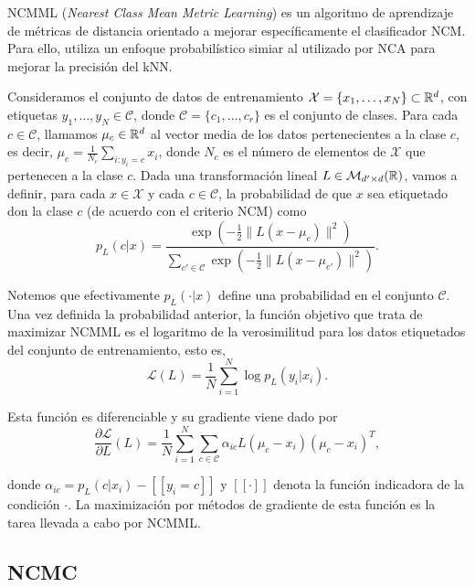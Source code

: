 NCMML (\emph{Nearest Class Mean Metric Learning}) \cite{ncmml} es un algoritmo de aprendizaje de métricas de distancia orientado a mejorar específicamente el clasificador NCM. Para ello, utiliza un enfoque probabilístico simiar al utilizado por NCA para mejorar la precisión del kNN.

Consideramos el conjunto de datos de entrenamiento $\mathcal{X} = \{x_1,\dots,x_N\} \subset \mathbb{R}^d$, con etiquetas $y_1,\dots,y_N \in \mathcal{C}$, donde $\mathcal{C} = \{c_1,\dots,c_r\}$ es el conjunto de clases. Para cada $c \in \mathcal{C}$, llamamos $\mu_c \in \mathbb{R}^d$ al vector media de los datos pertenecientes a la clase $c$, es decir, $\mu_c = \frac{1}{N_c}\sum_{i\colon y_i = c}x_i$, donde $N_c$ es el número de elementos de $\mathcal{X}$ que pertenecen a la clase $c$. Dada una transformación lineal $L \in \mathcal{M}_{d'\times d}(\mathbb{R})$, vamos a definir, para cada $x \in \mathcal{X}$ y cada $c \in \mathcal{C}$, la probabilidad de que $x$ sea etiquetado don la clase $c$ (de acuerdo con el criterio NCM) como
\begin{equation}
    p_L(c|x) = \frac{\exp\left(-\frac{1}{2} \|L(x - \mu_c)\|^2\right)}{\sum\limits_{c' \in \mathcal{C}} \exp\left(-\frac{1}{2} \|L(x - \mu_{c'})\|^2\right)}.
\end{equation} 

Notemos que efectivamente $p_L(\cdot|x)$ define una probabilidad en el conjunto $\mathcal{C}$. Una vez definida la probabilidad anterior, la función objetivo que trata de maximizar NCMML es el logaritmo de la verosimilitud para los datos etiquetados del conjunto de entrenamiento, esto es,
\begin{equation}
\mathcal{L}(L) = \frac{1}{N}\sum_{i=1}^N\log p_L(y_i|x_i).
\end{equation} 

Esta función es diferenciable y su gradiente viene dado por
\begin{equation}
\frac{\partial \mathcal{L}}{\partial L}(L) = \frac{1}{N} \sum_{i=1}^N \sum\limits_{c\in \mathcal{C}} \alpha_{ic} L (\mu_c - x_i)(\mu_c - x_i)^T,
\end{equation}

donde $\alpha_{ic} = p_L(c|x_i) - [\![ y_i = c ]\!]$ y $[\![ \cdot ]\!]$ denota la función indicadora de la condición $\cdot$. La maximización por métodos de gradiente de esta función es la tarea llevada a cabo por NCMML.



\subsection{NCMC} \label{section:ncmc}

